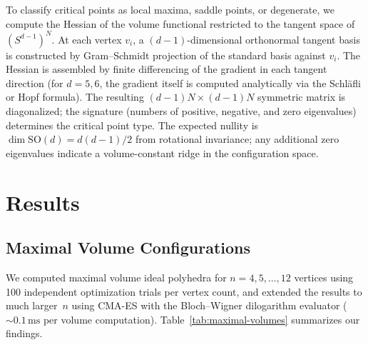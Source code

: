 \documentclass[11pt]{article}
\begin{document}
To classify critical points as local maxima, saddle points, or
degenerate, we compute the Hessian of the volume functional
restricted to the tangent space of $(S^{d-1})^N$.  At each vertex
$v_i$, a $(d-1)$-dimensional orthonormal tangent basis is
constructed by Gram--Schmidt projection of the standard basis
against $v_i$.  The Hessian is assembled by finite differencing
of the gradient in each tangent direction (for $d = 5, 6$, the
gradient itself is computed analytically via the Schl\"afli or
Hopf formula).  The resulting $(d-1)N \times (d-1)N$ symmetric
matrix is diagonalized; the signature (numbers of positive,
negative, and zero eigenvalues) determines the critical point type.
The expected nullity is $\dim\mathrm{SO}(d) = d(d-1)/2$ from
rotational invariance; any additional zero eigenvalues indicate
a volume-constant ridge in the configuration space.

\section{Results}

\subsection{Maximal Volume Configurations}

We computed maximal volume ideal polyhedra for $n = 4, 5, \ldots, 12$ vertices using 100 independent optimization trials per vertex count, and extended the results to much larger~$n$ using CMA-ES with the Bloch--Wigner
dilogarithm evaluator ($\sim 0.1\,\text{ms}$ per volume computation).
Table~\ref{tab:maximal-volumes} summarizes our findings.
\end{document}
